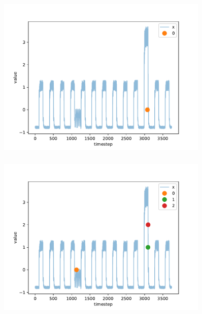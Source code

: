 \documentclass[hyperref={pdfpagelabels=false}]{beamer}
\begin{document}
\begin{frame}[label=]
\frametitle{}
\begin{figure}[H] 
  \centering
\includegraphics[width=0.9\textwidth]{../imgs/1d4}
\label{fig:1d4}
  \end{figure}


\end{frame}

\begin{frame}[label=]
\frametitle{}
\begin{figure}[H] 
  \centering
\includegraphics[width=0.9\textwidth]{../imgs/3d4}
\label{fig:3d4}
  \end{figure}


\end{frame}




\newpage
\end{document}
